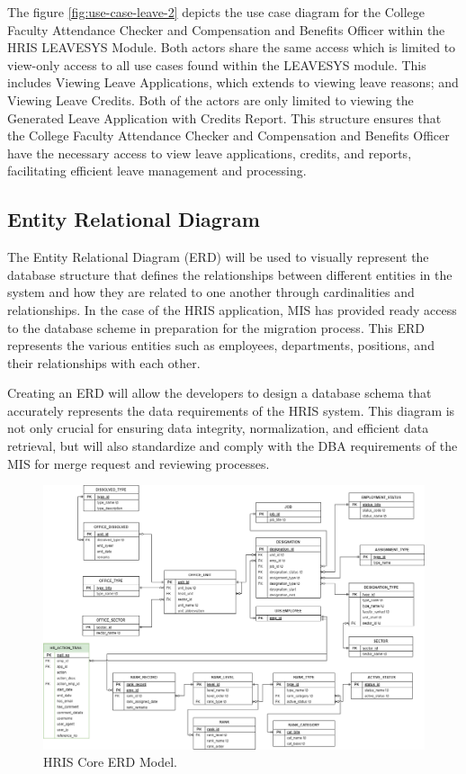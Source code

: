     The figure \ref{fig:use-case-leave-2} depicts the use case diagram for the College Faculty Attendance Checker and Compensation and Benefits Officer within the HRIS LEAVESYS Module. Both actors share the same access which is limited to view-only access to all use cases found within the LEAVESYS module. This includes Viewing Leave Applications, which extends to viewing leave reasons; and Viewing Leave Credits. Both of the actors are only limited to viewing the Generated Leave Application with Credits Report. This structure ensures that the College Faculty Attendance Checker and Compensation and Benefits Officer have the necessary access to view leave applications, credits, and reports, facilitating efficient leave management and processing.


    \subsection{Entity Relational Diagram}
    
    The Entity Relational Diagram (ERD) will be used to visually represent the database structure that defines the relationships between different entities in the system and how they are related to one another through cardinalities and relationships. In the case of the HRIS application, MIS has provided ready access to the database scheme in preparation for the migration process. This ERD represents the various entities such as employees, departments, positions, and their relationships with each other. 
    
    Creating an ERD will allow the developers to design a database schema that accurately represents the data requirements of the HRIS system. This diagram is not only crucial for ensuring data integrity, normalization, and efficient data retrieval, but will also standardize and comply with the DBA requirements of the MIS for merge request and reviewing processes.

    \begin{figure}[H]
        \centering
        \includegraphics[width=1\linewidth]{figures/images/erd-hris.png}
        \caption{HRIS Core ERD Model.}
        \label{fig:erd-hris}
    \end{figure}

